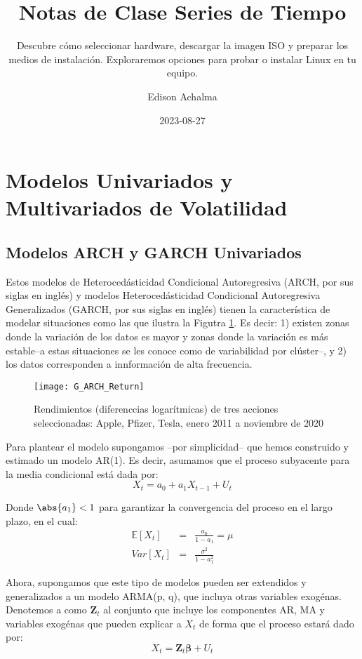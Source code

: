 \documentclass[
  a4paper,
]{article}
\title{Notas de Clase Series de Tiempo}
\subtitle{Descubre cómo seleccionar hardware, descargar la imagen ISO y
preparar los medios de instalación. Exploraremos opciones para probar o
instalar Linux en tu equipo.}
\author{Edison Achalma}
\date{2023-08-27}
\begin{document}
\maketitle

\section{Modelos Univariados y Multivariados de
Volatilidad}\label{modelos-univariados-y-multivariados-de-volatilidad}

\subsection{Modelos ARCH y GARCH
Univariados}\label{modelos-arch-y-garch-univariados}

Estos modelos de Heterocedásticidad Condicional Autoregresiva (ARCH, por
sus siglas en inglés) y modelos Heterocedásticidad Condicional
Autoregresiva Generalizados (GARCH, por sus siglas en inglés) tienen la
característica de modelar situaciones como las que ilustra la Figutra
\ref{G_ARCH_Return}. Es decir: 1) existen zonas donde la variación de
los datos es mayor y zonas donde la variación es más estable--a estas
situaciones se les conoce como de variabilidad por clúster--, y 2) los
datos corresponden a innformación de alta frecuencia.

\begin{figure}
  \centering
    \texttt{[image: G\_ARCH\_Return]}
  \caption{ Rendimientos (diferenccias logarítmicas) de tres acciones seleccionadas: Apple, Pfizer, Tesla, enero 2011 a noviembre de 2020}
  \label{G_ARCH_Return}
\end{figure}

Para plantear el modelo supongamos --por simplicidad-- que hemos
construido y estimado un modelo AR(1). Es decir, asumamos que el proceso
subyacente para la media condicional está dada por: \[
    X_t = a_0 + a_1 X_{t-1} + U_t
\]

Donde \(\abs{a_1} < 1\) para garantizar la convergencia del proceso en
el largo plazo, en el cual: \begin{eqnarray*}
    \mathbb{E}[X_t] & = & \frac{a_0 }{1 - a_1} = \mu \\
    Var[X_t] & = & \frac{\sigma^2}{1 - a_1^2}
\end{eqnarray*}

Ahora, supongamos que este tipo de modelos pueden ser extendidos y
generalizados a un modelo ARMA(p, q), que incluya otras variables
exogénas. Denotemos a como \(\mathbf{Z}_t\) al conjunto que incluye los
componentes AR, MA y variables exogénas que pueden explicar a \(X_t\) de
forma que el proceso estará dado por: \[
    X_t = \mathbf{Z}_t \boldsymbol{\beta} + U_t
\]
\end{document}
